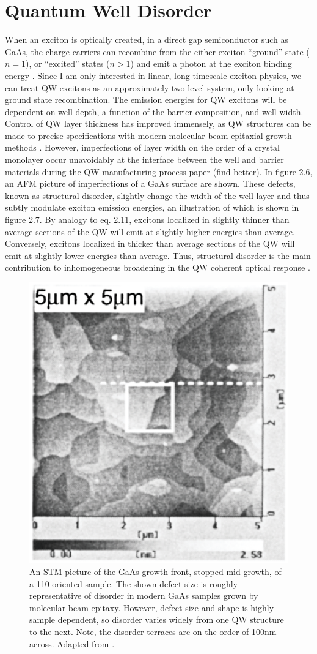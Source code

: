 \section{Quantum Well Disorder}
\indent When an exciton is optically created, in a direct gap semiconductor such as GaAs, the charge carriers can recombine from the either exciton ``ground'' state ($n=1$), or ``excited''  states ($n>1$) and emit a photon at the exciton binding energy \cite{gilleo}. Since I am only interested in linear, long-timescale exciton physics, we can treat QW excitons as an approximately two-level system, only looking at ground state recombination. The emission energies for QW excitons will be dependent on well depth, a function of the barrier composition, and well width. Control of QW layer thickness has improved immensely, as QW structures can be made to precise specifications with modern molecular beam epitaxial growth methods \cite{davies}. However, imperfections of layer width on the order of a crystal monolayer occur unavoidably at the interface between the well and barrier materials during the QW manufacturing process \cite{yoshitaterrace} paper (find better). In figure 2.6, an AFM picture of imperfections of a GaAs surface are shown. These defects, known as structural disorder, slightly change the width of the well layer and thus subtly modulate exciton emission energies, an illustration of which is shown in figure 2.7. By analogy to eq. 2.11, excitons localized in slightly thinner than average sections of the QW will emit at slightly higher energies than average. Conversely, excitons localized in thicker than average sections of the QW will emit at slightly lower energies than average. Thus, structural disorder is the main contribution to inhomogeneous broadening in the QW coherent optical response \cite{bristowsep}. 

\begin{figure}[h!]
\label{disorder}
\centering
\includegraphics[width = .4\textwidth]{disorder.eps}
\caption{\doublespacing An STM picture of the GaAs growth front, stopped mid-growth, of a 110 oriented sample. The shown defect size is roughly representative of disorder in modern GaAs samples grown by molecular beam epitaxy. However, defect size and shape is highly sample dependent, so disorder varies widely from one QW structure to the next. Note, the disorder terraces are on the order of 100nm across. Adapted from \cite{yoshitaterrace}.}
\label{rel}
\end{figure}

